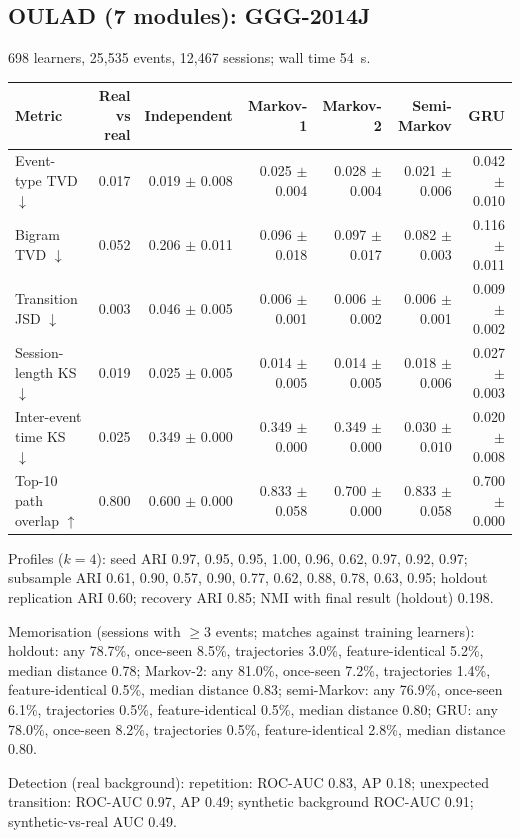 \subsection*{OULAD (7 modules): GGG-2014J}
698 learners, 25{,}535 events, 12{,}467 sessions; wall time 54~s.

\begin{tabular}{l r r r r r r }
\toprule
Metric & Real vs real & Independent & Markov-1 & Markov-2 & Semi-Markov & GRU \\
\midrule
Event-type TVD $\downarrow$ & 0.017 & 0.019 $\pm$ 0.008 & 0.025 $\pm$ 0.004 & 0.028 $\pm$ 0.004 & 0.021 $\pm$ 0.006 & 0.042 $\pm$ 0.010 \\
Bigram TVD $\downarrow$ & 0.052 & 0.206 $\pm$ 0.011 & 0.096 $\pm$ 0.018 & 0.097 $\pm$ 0.017 & 0.082 $\pm$ 0.003 & 0.116 $\pm$ 0.011 \\
Transition JSD $\downarrow$ & 0.003 & 0.046 $\pm$ 0.005 & 0.006 $\pm$ 0.001 & 0.006 $\pm$ 0.002 & 0.006 $\pm$ 0.001 & 0.009 $\pm$ 0.002 \\
Session-length KS $\downarrow$ & 0.019 & 0.025 $\pm$ 0.005 & 0.014 $\pm$ 0.005 & 0.014 $\pm$ 0.005 & 0.018 $\pm$ 0.006 & 0.027 $\pm$ 0.003 \\
Inter-event time KS $\downarrow$ & 0.025 & 0.349 $\pm$ 0.000 & 0.349 $\pm$ 0.000 & 0.349 $\pm$ 0.000 & 0.030 $\pm$ 0.010 & 0.020 $\pm$ 0.008 \\
Top-10 path overlap $\uparrow$ & 0.800 & 0.600 $\pm$ 0.000 & 0.833 $\pm$ 0.058 & 0.700 $\pm$ 0.000 & 0.833 $\pm$ 0.058 & 0.700 $\pm$ 0.000 \\
\bottomrule
\end{tabular}

Profiles ($k=4$): seed ARI 0.97, 0.95, 0.95, 1.00, 0.96, 0.62, 0.97, 0.92, 0.97; subsample ARI 0.61, 0.90, 0.57, 0.90, 0.77, 0.62, 0.88, 0.78, 0.63, 0.95; holdout replication ARI 0.60; recovery ARI 0.85; NMI with final result (holdout) 0.198.

Memorisation (sessions with $\geq$3 events; matches against training learners): holdout: any 78.7\%, once-seen 8.5\%, trajectories 3.0\%, feature-identical 5.2\%, median distance 0.78; Markov-2: any 81.0\%, once-seen 7.2\%, trajectories 1.4\%, feature-identical 0.5\%, median distance 0.83; semi-Markov: any 76.9\%, once-seen 6.1\%, trajectories 0.5\%, feature-identical 0.5\%, median distance 0.80; GRU: any 78.0\%, once-seen 8.2\%, trajectories 0.5\%, feature-identical 2.8\%, median distance 0.80.

Detection (real background): repetition: ROC-AUC 0.83, AP 0.18; unexpected transition: ROC-AUC 0.97, AP 0.49; synthetic background ROC-AUC 0.91; synthetic-vs-real AUC 0.49.

